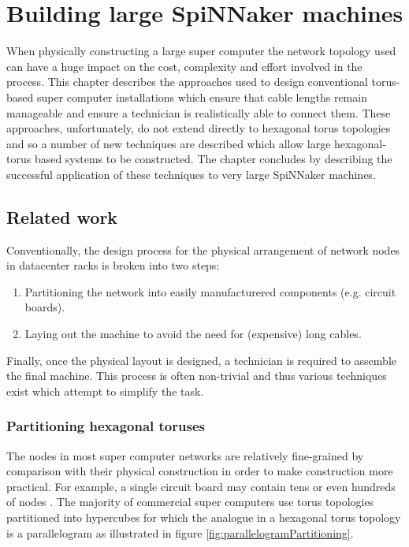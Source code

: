 \chapter{Building large SpiNNaker machines}
	
	When physically constructing a large super computer the network topology used
	can have a huge impact on the cost, complexity and effort involved in the
	process. This chapter describes the approaches used to design conventional
	torus-based super computer installations which ensure that cable lengths
	remain manageable and ensure a technician is realistically able to connect
	them. These approaches, unfortunately, do not extend directly to hexagonal
	torus topologies and so a number of new techniques are described which allow
	large hexagonal-torus based systems to be constructed. The chapter concludes
	by describing the successful application of these techniques to very large
	SpiNNaker machines.
	
	\section{Related work}
		
		Conventionally, the design process for the physical arrangement of network
		nodes in datacenter racks is broken into two steps:
		
		\begin{enumerate}
			
			\item Partitioning the network into easily manufacturered components
			(e.g. circuit boards).
			
			\item Laying out the machine to avoid the need for (expensive) long
			cables.
		
		\end{enumerate}
		
		Finally, once the physical layout is designed, a technician is required to
		assemble the final machine. This process is often non-trivial and thus
		various techniques exist which attempt to simplify the task.
		
		\subsection{Partitioning hexagonal toruses}
			
			The nodes in most super computer networks are relatively fine-grained by
			comparison with their physical construction in order to make construction
			more practical. For example, a single circuit board may contain tens or
			even hundreds of nodes \cite{gilge14,ajima12}. The majority of commercial
			super computers use torus topologies partitioned into hypercubes
			\cite{chen11,ajima12} for which the analogue in a hexagonal torus
			topology is a parallelogram as illustrated in figure
			\ref{fig:parallelogramPartitioning}.
			

